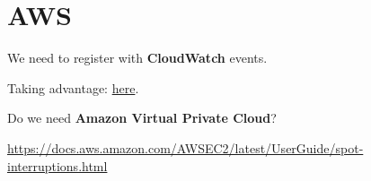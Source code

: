 \chapter{AWS}
\label{ch:aws}

We need to register with \textbf{CloudWatch} events.

Taking advantage:
\href{https://aws.amazon.com/blogs/compute/taking-advantage-of-amazon-ec2-spot-instance-interruption-notices/}{here}.

Do we need \textbf{Amazon Virtual Private Cloud}?

\url{https://docs.aws.amazon.com/AWSEC2/latest/UserGuide/spot-interruptions.html}






